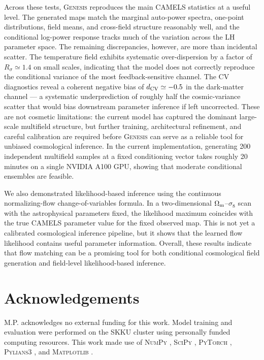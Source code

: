 \documentclass[usenatbib]{mnras}
\newcommand{\Om}{\Omega_{\rm m}}
\newcommand{\sig}{\sigma_8}
\begin{document}
Across these tests, \textsc{Genesis} reproduces the main CAMELS
statistics at a useful level. The generated maps match the marginal
auto-power spectra, one-point distributions, field means, and
cross-field structure reasonably well, and the conditional log-power
response tracks much of the variation across the LH parameter space.
The remaining discrepancies, however, are more than incidental scatter.
The temperature field exhibits systematic over-dispersion by a factor of
$R_\sigma \simeq 1.4$ on small scales, indicating that the model does not
correctly reproduce the conditional variance of the most
feedback-sensitive channel. The CV diagnostics reveal a coherent negative
bias of $d_{\rm CV}\simeq -0.5$ in the dark-matter channel --- a
systematic underprediction of roughly half the cosmic-variance scatter
that would bias downstream parameter inference if left uncorrected.
These are not cosmetic limitations: the current model has captured the
dominant large-scale multifield structure, but further training,
architectural refinement, and careful calibration are required before
\textsc{Genesis} can serve as a reliable tool for unbiased cosmological
inference. In the current implementation, generating 200
independent multifield samples at a fixed conditioning vector takes
roughly 20 minutes on a single NVIDIA A100 GPU, showing that moderate
conditional ensembles are feasible.

We also demonstrated likelihood-based inference using the continuous
normalizing-flow change-of-variables formula. In a two-dimensional
$\Om$--$\sig$ scan with the astrophysical parameters fixed, the
likelihood maximum coincides with the true CAMELS parameter value for
the fixed observed map. This is not yet a calibrated cosmological
inference pipeline, but it shows that the learned flow likelihood
contains useful parameter information. Overall, these results indicate
that flow matching can be a promising tool for both conditional
cosmological field generation and field-level likelihood-based
inference.

\section*{Acknowledgements}

M.P. acknowledges no external funding for this work.
Model training and evaluation were performed on the SKKU cluster using
personally funded computing resources.
This work made use of
\textsc{NumPy} \citep{Harris2020},
\textsc{SciPy} \citep{Virtanen2020},
\textsc{PyTorch} \citep{Paszke2019},
\textsc{Pylians3} \citep{Villaescusa2018Pylians},
and \textsc{Matplotlib} \citep{Hunter2007}.
\end{document}
